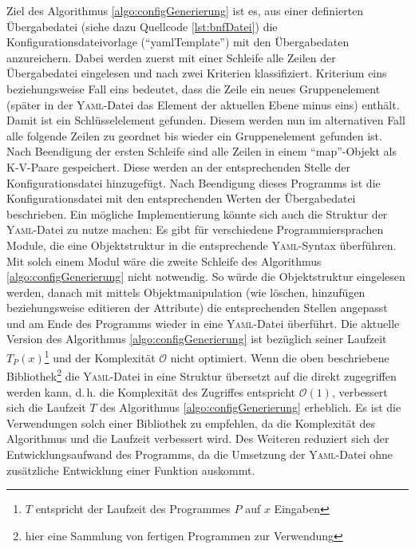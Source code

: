 Ziel des Algorithmus \vref{algo:configGenerierung} ist es, aus einer definierten Übergabedatei (siehe dazu Quellcode \vref{lst:bnfDatei}) die Konfigurationsdateivorlage (\enquote{yamlTemplate}) mit den Übergabedaten anzureichern. Dabei werden zuerst mit einer Schleife alle Zeilen der Übergabedatei eingelesen und nach zwei Kriterien klassifiziert. Kriterium eins beziehungsweise Fall eins bedeutet, dass die Zeile ein neues Gruppenelement (später in der \textsc{Yaml}-Datei das Element der aktuellen Ebene minus eins) enthält. Damit ist ein Schlüsselelement gefunden. Diesem werden nun im alternativen Fall alle folgende Zeilen zu geordnet bis wieder ein Gruppenelement gefunden ist. Nach Beendigung der ersten Schleife sind alle Zeilen in einem \enquote{map}-Objekt als \ac{K-V}-Paare gespeichert. Diese werden an der entsprechenden Stelle der Konfigurationsdatei hinzugefügt. Nach Beendigung dieses Programms ist die Konfigurationsdatei mit den entsprechenden Werten der Übergabedatei beschrieben. 
Ein mögliche Implementierung könnte sich auch die Struktur der \textsc{Yaml}-Datei zu nutze machen: Es gibt für verschiedene Programmiersprachen Module, die eine Objektstruktur in die entsprechende \textsc{Yaml}-Syntax überführen. Mit solch einem Modul wäre die zweite Schleife des Algorithmus \ref{algo:configGenerierung} nicht notwendig. So würde die Objektstruktur eingelesen werden, danach mit mittels Objektmanipulation (wie löschen, hinzufügen beziehungsweise editieren der Attribute) die entsprechenden Stellen angepasst und am Ende des Programms wieder in eine \textsc{Yaml}-Datei überführt. Die aktuelle Version des Algorithmus \ref{algo:configGenerierung} ist bezüglich seiner Laufzeit $T_{P}(x)$\footnote{$T$ entspricht der Laufzeit des Programmes $P$ auf $x$ Eingaben} und der Komplexität $\mathcal{O}$ nicht optimiert. Wenn die oben beschriebene Bibliothek\footnote{hier eine Sammlung von fertigen Programmen zur Verwendung} die \textsc{Yaml}-Datei in eine Struktur übersetzt auf die direkt zugegriffen werden kann, d.\,h. die Komplexität des Zugriffes entspricht $\mathcal{O}(1)$, verbessert sich die Laufzeit $T$ des Algorithmus \vref{algo:configGenerierung} erheblich. Es ist die Verwendungen solch einer Bibliothek zu empfehlen, da die Komplexität des Algorithmus und die Laufzeit verbessert wird. Des Weiteren reduziert sich der Entwicklungsaufwand des Programms, da die Umsetzung der \textsc{Yaml}-Datei ohne zusätzliche Entwicklung einer Funktion auskommt.

